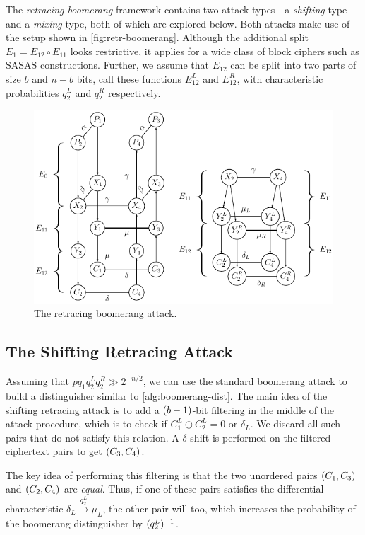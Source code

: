 \documentclass[twoside]{article}
\begin{document}
The \emph{retracing boomerang} framework contains two attack types - a
\emph{shifting} type and a \emph{mixing} type, both of which are explored below.
Both attacks make use of the setup shown in \autoref{fig:retr-boomerang}.
Although the additional split \(E_1 = E_{12} \circ E_{11}\) looks restrictive,
it applies for a wide class of block ciphers such as SASAS constructions.
Further, we assume that \(E_12\) can be split into two parts of size \(b\) and
\(n - b\) bits, call these functions \(E_{12}^L\) and \(E_{12}^R\), with
characteristic probabilities \(q_2^L\) and \(q_2^R\) respectively.

\begin{figure}[!ht]
    \centering
    \includegraphics[width=0.5\columnwidth]{images/retracing_boomerang.png}
    \caption{The retracing boomerang attack.}
    \label{fig:retr-boomerang}
\end{figure}

\subsection{The Shifting Retracing Attack}

Assuming that \(pq_1q_2^Lq_2^R \gg 2^{-n/2}\), we can use the standard boomerang
attack to build a distinguisher similar to \autoref{alg:boomerang-dist}. The
main idea of the shifting retracing attack is to add a \((b - 1)\)-bit
filtering in the middle of the attack procedure, which is to check if \(C_1^L
\oplus C_2^L = 0 \textrm{ or } \delta_L\). We discard all such pairs that do not
satisfy this relation. A \(\delta\)-shift is performed on the filtered
ciphertext pairs to get \((C_3, C_4)\).

The key idea of performing this filtering is that the two unordered pairs
\((C_1, C_3)\) and \((C_2, C_4)\) are \emph{equal}. Thus, if one of
these pairs satisfies the differential characteristic \(\delta_L
\xrightarrow{q_2^L} \mu_L\), the other pair will too, which increases the
probability of the boomerang distinguisher by \((q_2^L)^{-1}\).
\end{document}
